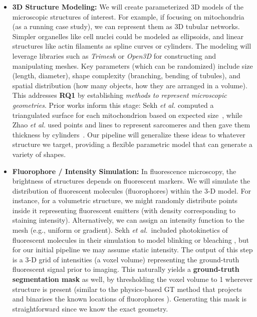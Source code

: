 \documentclass[
oneside,      %
openany       %
]{imc-inf}
\begin{document}
	\begin{itemize}
		\item \textbf{3D Structure Modeling:} We will create parameterized 3D models of the microscopic structures of interest. For example, if focusing on mitochondria (as a running case study), we can represent them as 3D tubular networks. Simpler organelles like cell nuclei could be modeled as ellipsoids, and linear structures like actin filaments as spline curves or cylinders. The modeling will leverage libraries such as \emph{Trimesh} or \emph{Open3D} for constructing and manipulating meshes. Key parameters (which can be randomized) include size (length, diameter), shape complexity (branching, bending of tubules), and spatial distribution (how many objects, how they are arranged in a volume). This addresses \textbf{RQ1} by establishing \emph{methods to represent microscopic geometries}. Prior works inform this stage: Sekh \emph{et al.} computed a triangulated surface for each mitochondrion based on expected size~\cite{sekh2021}, while Zhao \emph{et al.} used points and lines to represent sarcomeres and then gave them thickness by cylinders~\cite{zhao2021}. Our pipeline will generalize these ideas to whatever structure we target, providing a flexible parametric model that can generate a variety of shapes.
		
		\item \textbf{Fluorophore / Intensity Simulation:}	In fluorescence microscopy, the brightness of structures depends on fluorescent markers. We will simulate the distribution of fluorescent molecules (fluorophores) within the 3-D model. For instance, for a volumetric structure, we might randomly distribute points inside it representing fluorescent emitters (with density corresponding to staining intensity). Alternatively, we can assign an intensity function to the mesh (e.g., uniform or gradient). Sekh \textit{et al.}\ included photokinetics of fluorescent molecules in their simulation to model blinking or bleaching \cite{sekh2021}, but for our initial pipeline we may assume static intensity. The output of this step is a 3-D grid of intensities (a voxel volume) representing the ground-truth fluorescent signal prior to imaging.	This naturally yields a \textbf{ground-truth segmentation mask} as	well, by thresholding the voxel volume to 1 wherever structure is	present (similar to the physics-based GT method that projects and binarises the known locations of fluorophores \cite{sekh2021}). Generating this mask is straightforward since we know the exact geometry.
		

\end{itemize}
\end{document}
